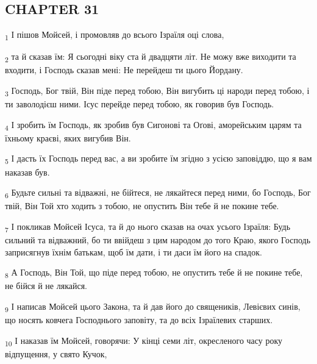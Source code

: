 \subsection{CHAPTER 31}
\begin{tcolorbox}
\textsubscript{1} І пішов Мойсей, і промовляв до всього Ізраїля оці слова,
\end{tcolorbox}
\begin{tcolorbox}
\textsubscript{2} та й сказав їм: Я сьогодні віку ста й двадцяти літ. Не можу вже виходити та входити, і Господь сказав мені: Не перейдеш ти цього Йордану.
\end{tcolorbox}
\begin{tcolorbox}
\textsubscript{3} Господь, Бог твій, Він піде перед тобою, Він вигубить ці народи перед тобою, і ти заволодієш ними. Ісус перейде перед тобою, як говорив був Господь.
\end{tcolorbox}
\begin{tcolorbox}
\textsubscript{4} І зробить їм Господь, як зробив був Сигонові та Оґові, аморейським царям та їхньому краєві, яких вигубив Він.
\end{tcolorbox}
\begin{tcolorbox}
\textsubscript{5} І дасть їх Господь перед вас, а ви зробите їм згідно з усією заповіддю, що я вам наказав був.
\end{tcolorbox}
\begin{tcolorbox}
\textsubscript{6} Будьте сильні та відважні, не бійтеся, не лякайтеся перед ними, бо Господь, Бог твій, Він Той хто ходить з тобою, не опустить Він тебе й не покине тебе.
\end{tcolorbox}
\begin{tcolorbox}
\textsubscript{7} І покликав Мойсей Ісуса, та й до нього сказав на очах усього Ізраїля: Будь сильний та відважний, бо ти ввійдеш з цим народом до того Краю, якого Господь заприсягнув їхнім батькам, щоб їм дати, і ти даси їм його на спадок.
\end{tcolorbox}
\begin{tcolorbox}
\textsubscript{8} А Господь, Він Той, що піде перед тобою, не опустить тебе й не покине тебе, не бійся й не лякайся.
\end{tcolorbox}
\begin{tcolorbox}
\textsubscript{9} І написав Мойсей цього Закона, та й дав його до священиків, Левієвих синів, що носять ковчега Господнього заповіту, та до всіх Ізраїлевих старших.
\end{tcolorbox}
\begin{tcolorbox}
\textsubscript{10} І наказав їм Мойсей, говорячи: У кінці семи літ, окресленого часу року відпущення, у свято Кучок,
\end{tcolorbox}
